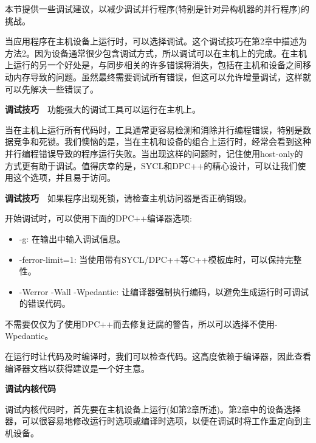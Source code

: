 本节提供一些调试建议，以减少调试并行程序(特别是针对异构机器的并行程序)的挑战。\par

当应用程序在主机设备上运行时，可以选择调试。这个调试技巧在第2章中描述为方法2。因为设备通常很少包含调试方式，所以调试可以在主机上的完成。在主机上运行的另一个好处是，与同步相关的许多错误将消失，包括在主机和设备之间移动内存导致的问题。虽然最终需要调试所有错误，但这可以允许增量调试，这样就可以先解决一些错误了。\par

\begin{tcolorbox}[colback=red!5!white,colframe=red!75!black]
\textbf{调试技巧} 功能强大的调试工具可以运行在主机上。
\end{tcolorbox}

当在主机上运行所有代码时，工具通常更容易检测和消除并行编程错误，特别是数据竞争和死锁。我们懊恼的是，当在主机和设备的组合上运行时，经常会看到这种并行编程错误导致的程序运行失败。当出现这样的问题时，记住使用host-only的方式更有助于调试。值得庆幸的是，SYCL和DPC++的精心设计，可以让我们使用这个选项，并且易于访问。\par

\begin{tcolorbox}[colback=red!5!white,colframe=red!75!black]
\textbf{调试技巧} 如果程序出现死锁，请检查主机访问器是否正确销毁。
\end{tcolorbox}

开始调试时，可以使用下面的DPC++编译器选项:\par

\begin{itemize}
	\item -g: 在输出中输入调试信息。
	\item -ferror-limit=1: 当使用带有SYCL/DPC++等C++模板库时，可以保持完整性。
	\item -Werror -Wall -Wpedantic: 让编译器强制执行编码，以避免生成运行时可调试的错误代码。
\end{itemize}

不需要仅仅为了使用DPC++而去修复迂腐的警告，所以可以选择不使用-Wpedantic。\par

在运行时让代码及时编译时，我们可以检查代码。这高度依赖于编译器，因此查看编译器文档以获得建议是一个好主意。\par

\hspace*{\fill} \par %
\textbf{调试内核代码}

调试内核代码时，首先要在主机设备上运行(如第2章所述)。第2章中的设备选择器，可以很容易地修改运行时选项或编译时选项，以便在调试时将工作重定向到主机设备。\par

